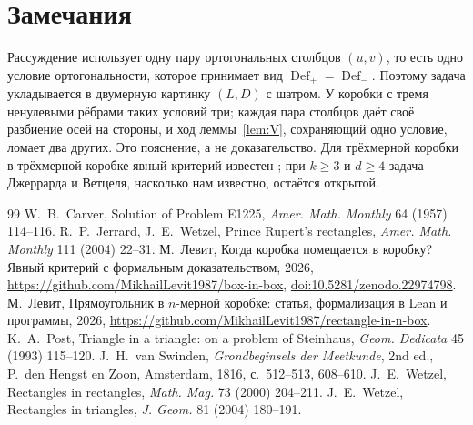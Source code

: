 \documentclass[11pt]{article}
\theoremstyle{definition}
\theoremstyle{remark}
\newcommand{\Def}{\operatorname{Def}}
\begin{document}
\section{Замечания}\label{sec:remarks}

Рассуждение использует одну пару ортогональных столбцов $(u,v)$, то есть одно условие ортогональности,
которое принимает вид $\Def_+=\Def_-$. Поэтому задача укладывается в двумерную картинку $(L,D)$ с шатром. У
коробки с тремя ненулевыми рёбрами таких условий три; каждая пара столбцов даёт своё разбиение осей на
стороны, и ход леммы~\ref{lem:V}, сохраняющий одно условие, ломает два других. Это пояснение, а не
доказательство. Для трёхмерной коробки в трёхмерной коробке явный критерий известен \cite{Levit2026}; при
$k\ge3$ и $d\ge4$ задача Джеррарда и Ветцеля, насколько нам известно, остаётся открытой.

\begin{thebibliography}{99}
 W.~B.~Carver, Solution of Problem E1225, \emph{Amer. Math. Monthly} 64 (1957) 114--116.
 R.~P.~Jerrard, J.~E.~Wetzel, Prince Rupert's rectangles, \emph{Amer. Math. Monthly} 111 (2004) 22--31.
 М.~Левит, Когда коробка помещается в коробку? Явный критерий с формальным
доказательством, 2026, \url{https://github.com/MikhailLevit1987/box-in-box},
\href{https://doi.org/10.5281/zenodo.22974798}{doi:10.5281/zenodo.22974798}.
 М.~Левит, Прямоугольник в $n$-мерной коробке: статья, формализация в Lean и программы, 2026,
\url{https://github.com/MikhailLevit1987/rectangle-in-n-box}.
 K.~A.~Post, Triangle in a triangle: on a problem of Steinhaus, \emph{Geom. Dedicata} 45 (1993) 115--120.
 J.~H.~van Swinden, \emph{Grondbeginsels der Meetkunde}, 2nd ed., P.~den Hengst en Zoon, Amsterdam, 1816, с.~512--513, 608--610.
 J.~E.~Wetzel, Rectangles in rectangles, \emph{Math. Mag.} 73 (2000) 204--211.
 J.~E.~Wetzel, Rectangles in triangles, \emph{J. Geom.} 81 (2004) 180--191.
\end{thebibliography}
\end{document}
